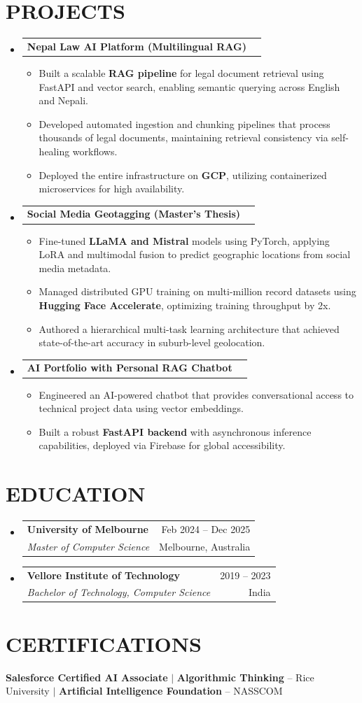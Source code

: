 \documentclass[letterpaper,11pt]{article}
\makeatletter
\newcommand{\resumeItem}[1]{\item\small{{#1 \vspace{-1pt}}}}
\newcommand{\resumeSubheading}[4]{\vspace{-1pt}\item\begin{tabular*}{\textwidth}[t]{l@{\extracolsep{\fill}}r}\textbf{#1} & {\color{dark-grey}\small #2}\vspace{1pt}\\\textit{#3} & {\color{dark-grey} \small #4}\\\end{tabular*}\vspace{-4pt}}
\newcommand{\resumeProjectHeading}[2]{\item\begin{tabular*}{\textwidth}{l@{\extracolsep{\fill}}r}#1 & {\color{dark-grey}} \\\end{tabular*}\vspace{-4pt}}
\newcommand{\resumeSubHeadingListStart}{\begin{itemize}[leftmargin=0in, label={}]}
\newcommand{\resumeSubHeadingListEnd}{\end{itemize}}
\newcommand{\resumeItemListStart}{\begin{itemize}}
\newcommand{\resumeItemListEnd}{\end{itemize}\vspace{0pt}}
\makeatother
\begin{document}
\section{PROJECTS}
\resumeSubHeadingListStart
\resumeProjectHeading{\textbf{Nepal Law AI Platform (Multilingual RAG)}}{ }
\resumeItemListStart
\resumeItem{Built a scalable \textbf{RAG pipeline} for legal document retrieval using FastAPI and vector search, enabling semantic querying across English and Nepali.}
\resumeItem{Developed automated ingestion and chunking pipelines that process thousands of legal documents, maintaining retrieval consistency via self-healing workflows.}
\resumeItem{Deployed the entire infrastructure on \textbf{GCP}, utilizing containerized microservices for high availability.}
\resumeItemListEnd

\resumeProjectHeading{\textbf{Social Media Geotagging (Master’s Thesis)}}{ }
\resumeItemListStart
\resumeItem{Fine-tuned \textbf{LLaMA and Mistral} models using PyTorch, applying LoRA and multimodal fusion to predict geographic locations from social media metadata.}
\resumeItem{Managed distributed GPU training on multi-million record datasets using \textbf{Hugging Face Accelerate}, optimizing training throughput by 2x.}
\resumeItem{Authored a hierarchical multi-task learning architecture that achieved state-of-the-art accuracy in suburb-level geolocation.}
\resumeItemListEnd

\resumeProjectHeading{\textbf{AI Portfolio with Personal RAG Chatbot}}{ }
\resumeItemListStart
\resumeItem{Engineered an AI-powered chatbot that provides conversational access to technical project data using vector embeddings.}
\resumeItem{Built a robust \textbf{FastAPI backend} with asynchronous inference capabilities, deployed via Firebase for global accessibility.}
\resumeItemListEnd
\resumeSubHeadingListEnd

\section{EDUCATION}
\resumeSubHeadingListStart
\resumeSubheading{University of Melbourne}{Feb 2024 -- Dec 2025}{Master of Computer Science}{Melbourne, Australia}
\resumeSubheading{Vellore Institute of Technology}{2019 -- 2023}{Bachelor of Technology, Computer Science}{India}
\resumeSubHeadingListEnd

\section{CERTIFICATIONS}
\begin{itemize}[leftmargin=0in, label={}]
\small{\item{\textbf{Salesforce Certified AI Associate} $|$ \textbf{Algorithmic Thinking} -- Rice University $|$ \textbf{Artificial Intelligence Foundation} -- NASSCOM}}
\end{itemize}
\end{document}
